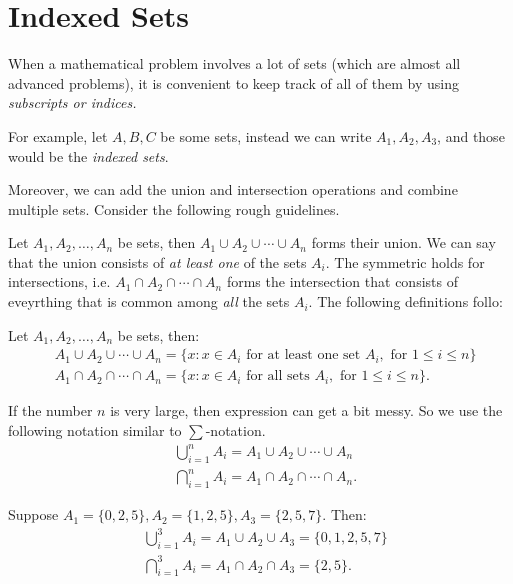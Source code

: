 \section{Indexed Sets}
When a mathematical problem involves a lot of sets (which are almost all advanced problems), it is convenient to keep track of all of them by using \emph{subscripts or indices.}

For example, let $A,B,C$ be some sets, instead we can write $A_{1},A_{2},A_{3}$, and those would be the \emph{indexed sets}.

Moreover, we can add the union and intersection operations and combine multiple sets. Consider the following rough guidelines. 

Let $A_{1},A_{2},\dots,A_{n}$ be sets, then $A_1\cup A_2 \cup\cdots\cup A_n$ forms their union. We can say that the union consists of \emph{at least one} of the sets $A_i$. The symmetric holds for intersections, i.e. $A_1\cap A_2\cap\cdots\cap A_n$ forms the intersection that consists of eveyrthing that is common among \emph{all} the sets $A_i$. 
The following definitions follo: 
\begin{defn}
    Let $A_{1},A_{2},\dots,A_{n}$ be sets, then:
    $$
    \begin{aligned}
        &A_1\cup A_2 \cup \cdots \cup A_n = \{ x:x\in A_i \text{ for at least one set } A_i, \text{ for } 1\le i \le n \}\\
        &A_1\cap A_2 \cap \cdots \cap A_n =\{ x:x\in A_i \text{ for all sets } A_i, \text{ for } 1\le i \le n \}.
    \end{aligned}
    $$
\end{defn}

If the number $n$ is very large, then expression can get a bit messy. So we use the following notation similar to $\sum$-notation. 
$$
\begin{aligned}
    &\bigcup^{n}_{i=1}A_{i}=A_1\cup A_2\cup\cdots\cup A_n\\
    &\bigcap^{n}_{i=1}A_i=A_1\cap A_2\cap\cdots\cap A_n.
\end{aligned}
$$
\begin{example}
    Suppose $A_1=\{ 0,2,5 \},A_2=\{ 1,2,5 \},A_3=\{ 2,5,7 \}$. Then: 
    $$
    \begin{aligned}
        &\bigcup^{3}_{i=1}A_i= A_1\cup A_2 \cup A_3=\{ 0,1,2,5,7 \}\\
        &\bigcap^{3}_{i=1}A_i= A_1\cap A_2 \cap A_3 = \{ 2,5 \}.
    \end{aligned}
    $$
\end{example}

